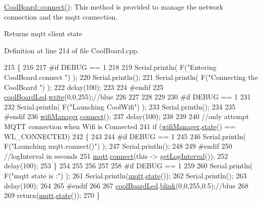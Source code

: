 \hyperlink{class_cool_board_a519de78b807f8ec6463ff484eb925918}{Cool\+Board\+::connect()}\+: This method is provided to manage the network connection and the mqtt connection.

\begin{DoxyReturn}{Returns}
mqtt client state 
\end{DoxyReturn}


Definition at line 214 of file Cool\+Board.\+cpp.


\begin{DoxyCode}
215 \{
216 
217 \textcolor{preprocessor}{#if DEBUG == 1  }
218 
219     Serial.println( F(\textcolor{stringliteral}{"Entering CoolBoard.connect "}) );
220     Serial.println();
221     Serial.println( F(\textcolor{stringliteral}{"Connecting the CoolBoard  "}) );
222     delay(100);
223 
224 \textcolor{preprocessor}{#endif}
225     \hyperlink{class_cool_board_a1b1d3c684a5baa56b08486e192fd8e97}{coolBoardLed}.\hyperlink{class_cool_board_led_a30fadd4cbec17ceea428bf7a32207e87}{write}(0,0,255);\textcolor{comment}{//blue}
226 
227     
228             
229     
230 \textcolor{preprocessor}{#if DEBUG == 1      }
231 
232     Serial.println( F(\textcolor{stringliteral}{"Launching CoolWifi"}) );
233     Serial.println();
234 
235 \textcolor{preprocessor}{#endif}
236     \hyperlink{class_cool_board_acd88e6003606b47479ebba81e4aceeca}{wifiManager}.\hyperlink{class_cool_wifi_ad060353050f40d032a2dbf9e54a768bf}{connect}();
237     delay(100);
238 
239 
240     \textcolor{comment}{//only attempt MQTT connection when Wifi is Connected}
241     \textcolor{keywordflow}{if} (\hyperlink{class_cool_board_acd88e6003606b47479ebba81e4aceeca}{wifiManager}.\hyperlink{class_cool_wifi_a1c7b4d82a4098d346e7593dce92039fa}{state}() == WL\_CONNECTED)
242     \{
243 
244 \textcolor{preprocessor}{    #if DEBUG == 1  }
245     
246         Serial.println( F(\textcolor{stringliteral}{"Launching mqtt.connect()"}) );
247         Serial.println();
248     
249 \textcolor{preprocessor}{    #endif  }
250         \textcolor{comment}{//logInterval in seconds}
251         \hyperlink{class_cool_board_a2399f44d7c23c1149a335cb3b46d90f1}{mqtt}.\hyperlink{class_cool_m_q_t_t_a50075d0ab23a327ab897fd6adad20eda}{connect}(\textcolor{keyword}{this} -> \hyperlink{class_cool_board_a7508e029f2ee17bb747ffab599285e0d}{getLogInterval}());
252         delay(100);
253     \}
254     
255         
256     
257     
258 \textcolor{preprocessor}{#if DEBUG == 1}
259 
260     Serial.println( F(\textcolor{stringliteral}{"mqtt state is :"}) );
261     Serial.println(\hyperlink{class_cool_board_a2399f44d7c23c1149a335cb3b46d90f1}{mqtt}.\hyperlink{class_cool_m_q_t_t_a5d003307eff78efbd585e42b43b72b6d}{state}());
262     Serial.println();
263     delay(100);
264 
265 \textcolor{preprocessor}{#endif}
266 
267     \hyperlink{class_cool_board_a1b1d3c684a5baa56b08486e192fd8e97}{coolBoardLed}.\hyperlink{class_cool_board_led_a96e1ea13003eee34c9dbcef340404426}{blink}(0,0,255,0.5);\textcolor{comment}{//blue}
268 
269     \textcolor{keywordflow}{return}(\hyperlink{class_cool_board_a2399f44d7c23c1149a335cb3b46d90f1}{mqtt}.\hyperlink{class_cool_m_q_t_t_a5d003307eff78efbd585e42b43b72b6d}{state}());
270 \}
\end{DoxyCode}
